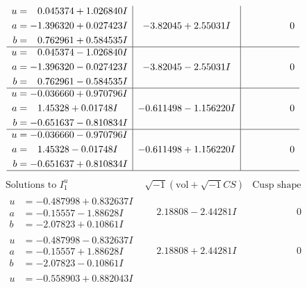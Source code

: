 \documentclass[1p]{elsarticle_modified}
\theoremstyle{definition}
\newcommand{\I}{\sqrt{-1}}
\begin{document}
$$\begin{array}{c|c|c}
\begin{aligned}
u &= \phantom{-}0.045374 + 1.026840 I \\
a &= -1.396320 + 0.027423 I \\
b &= \phantom{-}0.762961 + 0.584535 I\end{aligned}
 & -3.82045 + 2.55031 I & \phantom{-0.000000 } 0 \\ \hline\begin{aligned}
u &= \phantom{-}0.045374 - 1.026840 I \\
a &= -1.396320 - 0.027423 I \\
b &= \phantom{-}0.762961 - 0.584535 I\end{aligned}
 & -3.82045 - 2.55031 I & \phantom{-0.000000 } 0 \\ \hline\begin{aligned}
u &= -0.036660 + 0.970796 I \\
a &= \phantom{-}1.45328 + 0.01748 I \\
b &= -0.651637 - 0.810834 I\end{aligned}
 & -0.611498 - 1.156220 I & \phantom{-0.000000 } 0 \\ \hline\begin{aligned}
u &= -0.036660 - 0.970796 I \\
a &= \phantom{-}1.45328 - 0.01748 I \\
b &= -0.651637 + 0.810834 I\end{aligned}
 & -0.611498 + 1.156220 I & \phantom{-0.000000 } 0\\
 \hline 
 \end{array}$$\newpage$$\begin{array}{c|c|c}  
\text{Solutions to }I^u_{1}& \I (\text{vol} + \sqrt{-1}CS) & \text{Cusp shape}\\
 \hline 
\begin{aligned}
u &= -0.487998 + 0.832637 I \\
a &= -0.15557 - 1.88628 I \\
b &= -2.07823 + 0.10861 I\end{aligned}
 & \phantom{-}2.18808 - 2.44281 I & \phantom{-0.000000 } 0 \\ \hline\begin{aligned}
u &= -0.487998 - 0.832637 I \\
a &= -0.15557 + 1.88628 I \\
b &= -2.07823 - 0.10861 I\end{aligned}
 & \phantom{-}2.18808 + 2.44281 I & \phantom{-0.000000 } 0 \\ \hline\begin{aligned}
u &= -0.558903 + 0.882043 I \\

\end{aligned}
\end{array}$$
\end{document}
